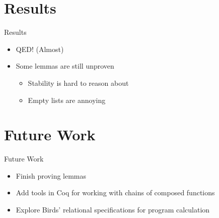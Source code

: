\documentclass{beamer}
\begin{document}
  \section{Results}
  \begin{frame}{Results}
    \begin{itemize}
    \item QED! (Almost)
    \item Some lemmas are still unproven
      \begin{itemize}
      \item Stability is hard to reason about
      \item Empty lists are annoying
      \end{itemize}
    \end{itemize}
  \end{frame}

  \section{Future Work}
  \begin{frame}{Future Work}
    \begin{itemize}
      \item Finish proving lemmas
      \item Add tools in Coq for working with chains of composed functions
      \item Explore Birds' relational specifications for program calculation
    \end{itemize}
  \end{frame}
\end{document}
